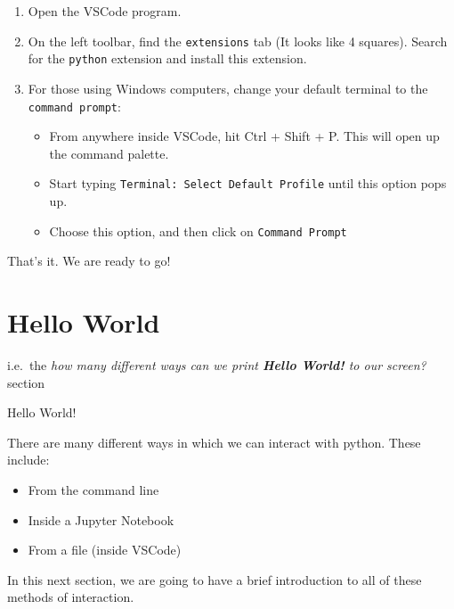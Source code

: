 \documentclass[
  letterpaper,
  DIV=11,
  numbers=noendperiod]{scrreprt}
\providecommand{\tightlist}{%
  \setlength{\itemsep}{0pt}\setlength{\parskip}{0pt}}\usepackage{longtable,booktabs,array}
\begin{document}
\begin{enumerate}
\def\labelenumi{\arabic{enumi}.}
\tightlist
\item
  Open the VSCode program.
\item
  On the left toolbar, find the \texttt{extensions} tab (It looks like 4
  squares). Search for the \texttt{python} extension and install this
  extension.
\item
  For those using Windows computers, change your default terminal to the
  \texttt{command\ prompt}:

  \begin{itemize}
  \tightlist
  \item
    From anywhere inside VSCode, hit Ctrl + Shift + P. This will open up
    the command palette.
  \item
    Start typing \texttt{Terminal:\ Select\ Default\ Profile} until this
    option pops up.
  \item
    Choose this option, and then click on \texttt{Command\ Prompt}
  \end{itemize}
\end{enumerate}

That's it. We are ready to go!

\hypertarget{hello-world}{%
\section{Hello World}\label{hello-world}}

i.e.~the \emph{how many different ways can we print \textbf{Hello
World!} to our screen?} section

Hello World!

There are many different ways in which we can interact with python.
These include:

\begin{itemize}
\tightlist
\item
  From the command line
\item
  Inside a Jupyter Notebook
\item
  From a file (inside VSCode)
\end{itemize}

In this next section, we are going to have a brief introduction to all
of these methods of interaction.
\end{document}
